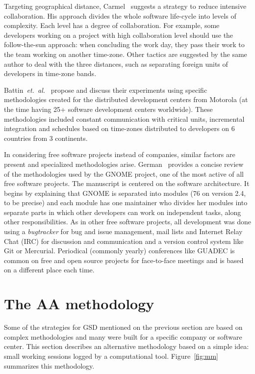 \documentclass{article}
\newcommand{\etal}{{\it et.~al.}}
\begin{document}
Targeting geographical distance, Carmel~\cite{carmel2001} suggests a
strategy to reduce intensive collaboration. His approach divides the
whole software life-cycle into levels of complexity. Each level has a
degree of collaboration. For example, some developers working on a
project with high collaboration level should use the follow-the-sun
approach: when concluding the work day, they pass their work to the
team working on another time-zone. Other tactics are suggested by the
same author to deal with the three distances, such as separating foreign
units of developers in time-zone bands.

Battin~\etal~\cite{battin2001} propose and discuss their experiments using
specific methodologies created for the distributed development centers from
Motorola (at the time having 25+ software development centers worldwide). These
methodologies included constant communication with critical units, incremental
integration and schedules based on time-zones distributed to developers on 6
countries from 3 continents.

In considering free software projects instead of companies,
similar factors are present and specialized methodologies
arise. German~\cite{german2003} provides a concise review of
the methodologies used by the GNOME project, one of the most active of all free
software projects. The manuscript is centered on the software architecture. It
begins by explaining that GNOME is separated into modules (76 on version 2.4, to be
precise) and each module has one maintainer who divides her modules into
separate parts in which other developers can work on independent tasks, along
other responsibilities. As in other free software projects, all 
development was done using a \emph{bugtracker} for bug and issue management,
mail lists and Internet Relay Chat (IRC) for discussion and communication and a
version control system like Git or Mercurial. Periodical (commonly yearly)
conferences like GUADEC is common on free and open source projects for
face-to-face meetings and is based on a different place each time.


\section{The AA methodology}
\label{aa-methodology}

Some of the strategies for GSD mentioned on the previous section are based on
complex methodologies and many were built for a specific company or software
center. This section describes an alternative methodology based on a simple idea: small
working sessions logged by a computational tool. Figure~\ref{fig:mm} summarizes
this methodology.
\end{document}
